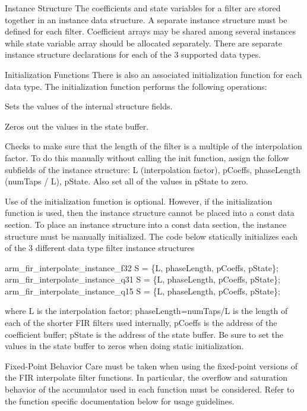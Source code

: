 \begin{DoxyParagraph}{Instance Structure}
The coefficients and state variables for a filter are stored together in an instance data structure. A separate instance structure must be defined for each filter. Coefficient arrays may be shared among several instances while state variable array should be allocated separately. There are separate instance structure declarations for each of the 3 supported data types.
\end{DoxyParagraph}
\begin{DoxyParagraph}{Initialization Functions}
There is also an associated initialization function for each data type. The initialization function performs the following operations\+:
\begin{DoxyItemize}
\item Sets the values of the internal structure fields.
\item Zeros out the values in the state buffer.
\item Checks to make sure that the length of the filter is a multiple of the interpolation factor. To do this manually without calling the init function, assign the follow subfields of the instance structure\+: L (interpolation factor), p\+Coeffs, phase\+Length (num\+Taps / L), p\+State. Also set all of the values in p\+State to zero.
\end{DoxyItemize}
\end{DoxyParagraph}
\begin{DoxyParagraph}{}
Use of the initialization function is optional. However, if the initialization function is used, then the instance structure cannot be placed into a const data section. To place an instance structure into a const data section, the instance structure must be manually initialized. The code below statically initializes each of the 3 different data type filter instance structures 
\begin{DoxyPre}
arm\_fir\_interpolate\_instance\_f32 S = \{L, phaseLength, pCoeffs, pState\};
arm\_fir\_interpolate\_instance\_q31 S = \{L, phaseLength, pCoeffs, pState\};
arm\_fir\_interpolate\_instance\_q15 S = \{L, phaseLength, pCoeffs, pState\};
\end{DoxyPre}
 where {\ttfamily L} is the interpolation factor; {\ttfamily phase\+Length=num\+Taps/L} is the length of each of the shorter F\+IR filters used internally, {\ttfamily p\+Coeffs} is the address of the coefficient buffer; {\ttfamily p\+State} is the address of the state buffer. Be sure to set the values in the state buffer to zeros when doing static initialization.
\end{DoxyParagraph}
\begin{DoxyParagraph}{Fixed-\/\+Point Behavior}
Care must be taken when using the fixed-\/point versions of the F\+IR interpolate filter functions. In particular, the overflow and saturation behavior of the accumulator used in each function must be considered. Refer to the function specific documentation below for usage guidelines. 
\end{DoxyParagraph}


